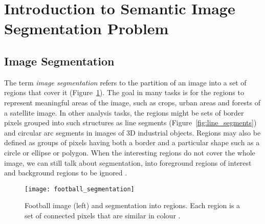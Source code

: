 \section{Introduction to Semantic Image Segmentation Problem}
\subsection{Image Segmentation}
The term \emph{image segmentation} refers to the partition of an image into a
set of regions that cover it (Figure~\ref{fig:football_segmentation}). The goal
in many tasks is for the regions to represent meaningful areas of the image,
such as crops, urban areas and forests of a satellite image. In other analysis
tasks, the regions might be sets of border pixels grouped into such structures
as line segments (Figure~\ref{fig:line_segments}) and circular arc segments
in images of 3D industrial objects. Regions may also be defined as groups of
pixels having both a border and a particular shape such as a circle or ellipse
or polygon. When the interesting regions do not cover the whole image, we can
still talk about segmentation, into foreground regions of interest and
background regions to be ignored \cite{book:28867}.
\begin{figure}[h]
    \centering
    \texttt{[image: football\_segmentation]}
    \caption{
    Football image (left) and segmentation into regions.
    Each region is a set of connected pixels that are similar in colour
    \cite{book:28867}.
    }
    \label{fig:football_segmentation}
\end{figure}


